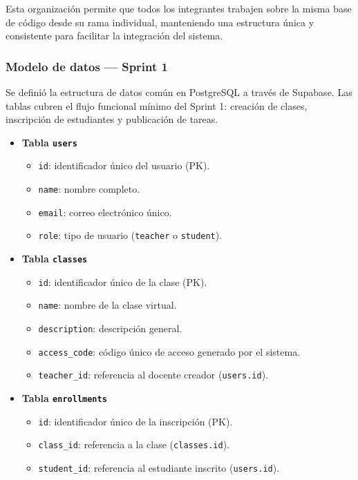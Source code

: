 \documentclass[12pt,a4paper]{article}
\begin{document}
Esta organización permite que todos los integrantes trabajen sobre la misma base de código desde su rama individual, manteniendo una estructura única y consistente para facilitar la integración del sistema.

\subsubsection*{Modelo de datos — Sprint 1}

Se definió la estructura de datos común en PostgreSQL a través de Supabase. Las tablas cubren el flujo funcional mínimo del Sprint 1: creación de clases, inscripción de estudiantes y publicación de tareas.

\begin{itemize}
    \item \textbf{Tabla \texttt{users}}
    \begin{itemize}
        \item \texttt{id}: identificador único del usuario (PK).
        \item \texttt{name}: nombre completo.
        \item \texttt{email}: correo electrónico único.
        \item \texttt{role}: tipo de usuario (\texttt{teacher} o \texttt{student}).
    \end{itemize}

    \item \textbf{Tabla \texttt{classes}}
    \begin{itemize}
        \item \texttt{id}: identificador único de la clase (PK).
        \item \texttt{name}: nombre de la clase virtual.
        \item \texttt{description}: descripción general.
        \item \texttt{access\_code}: código único de acceso generado por el sistema.
        \item \texttt{teacher\_id}: referencia al docente creador (\texttt{users.id}).
    \end{itemize}

    \item \textbf{Tabla \texttt{enrollments}}
    \begin{itemize}
        \item \texttt{id}: identificador único de la inscripción (PK).
        \item \texttt{class\_id}: referencia a la clase (\texttt{classes.id}).
        \item \texttt{student\_id}: referencia al estudiante inscrito (\texttt{users.id}).
    \end{itemize}


\end{itemize}
\end{document}
